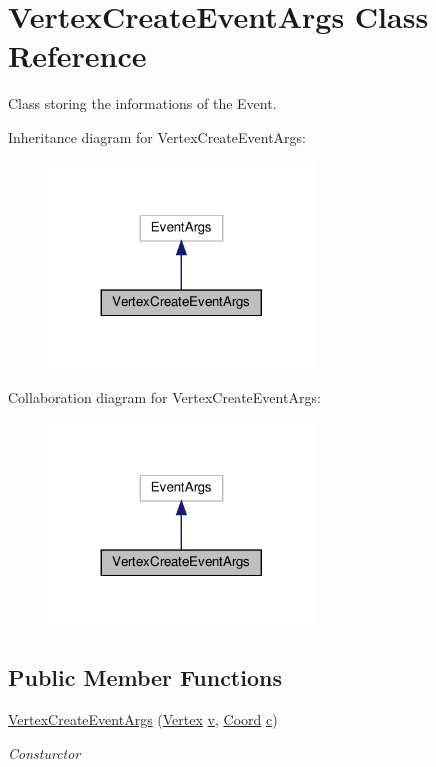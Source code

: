 \hypertarget{classVertexCreateEventArgs}{}\section{Vertex\+Create\+Event\+Args Class Reference}
\label{classVertexCreateEventArgs}


Class storing the informations of the Event.  




Inheritance diagram for Vertex\+Create\+Event\+Args\+:\nopagebreak
\begin{figure}[H]
\begin{center}
\leavevmode
\includegraphics[width=200pt]{classVertexCreateEventArgs__inherit__graph}
\end{center}
\end{figure}


Collaboration diagram for Vertex\+Create\+Event\+Args\+:\nopagebreak
\begin{figure}[H]
\begin{center}
\leavevmode
\includegraphics[width=200pt]{classVertexCreateEventArgs__coll__graph}
\end{center}
\end{figure}
\subsection*{Public Member Functions}
\begin{DoxyCompactItemize}
\item 
\hyperlink{classVertexCreateEventArgs_ad9b5487ebecc3eae5d6d0e8363efe52c}{Vertex\+Create\+Event\+Args} (\hyperlink{structVertex}{Vertex} \hyperlink{classVertexCreateEventArgs_a6ce40981e1826b6d52987abf3382172a}{v}, \hyperlink{structCoord}{Coord} \hyperlink{classVertexCreateEventArgs_a69cf9a65e5ecd6f26cafa1141bad6e0c}{c})  
\begin{DoxyCompactList}\small\item\em Consturctor \end{DoxyCompactList}\end{DoxyCompactItemize}
